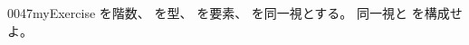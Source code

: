 \documentclass[index]{subfiles}
\begin{document}
\begin{myBlock}{0047}{myExercise}
  を階数、
  を型、
  を要素、
  を同一視とする。
  同一視と
  を構成せよ。
\end{myBlock}
\end{document}
